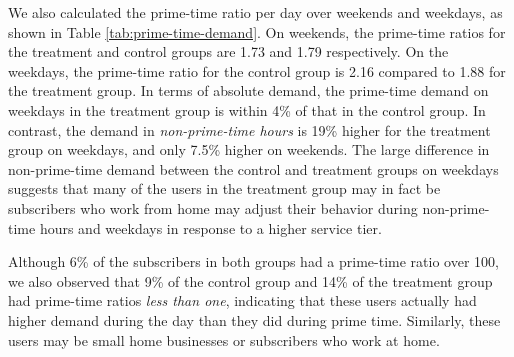 

We also calculated the prime-time ratio per day over weekends and
weekdays, as shown in Table \ref{tab:prime-time-demand}.  On weekends,
the prime-time ratios for the treatment and control groups are 1.73 and
1.79 respectively. On the weekdays, the prime-time ratio for the control
group is 2.16 compared to 1.88 for the treatment group. 
In terms of absolute demand, the prime-time demand
on weekdays in the treatment group is within 4\%
of that in the control group. In contrast, the demand in
{\em non-prime-time hours} is 19\% higher for the treatment group on weekdays,
and only 7.5\% higher on weekends. The large difference in non-prime-time
demand between the control and treatment groups on weekdays suggests
that many of the users in the treatment group may in fact be subscribers
who work from home may adjust their behavior during non-prime-time hours
and weekdays in response to a higher service tier.

Although 6\% of the subscribers in both groups had a prime-time ratio over
100, we also observed that 9\% of the control group and 14\% of the
treatment group had prime-time ratios {\em less than one}, indicating that
these users actually had higher demand during the day than they did
during prime time. Similarly, these users may be small home
businesses or subscribers who work at home.



